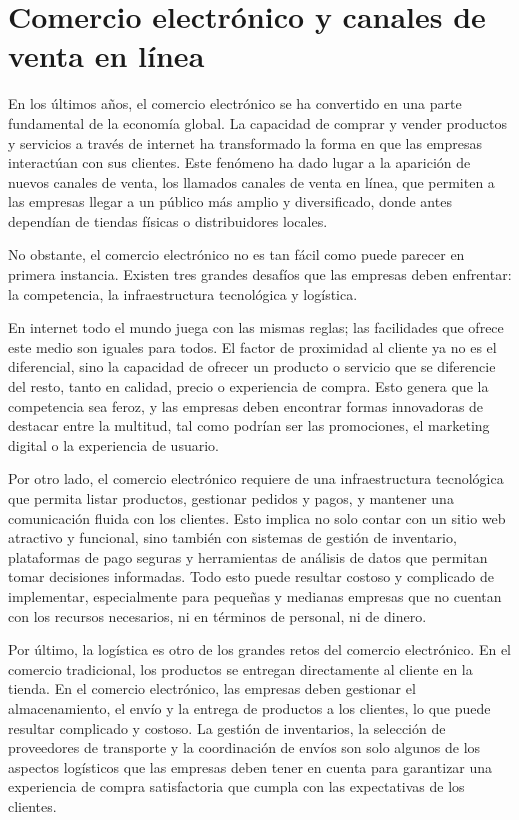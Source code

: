 \section{Comercio electrónico y canales de venta en línea}
\label{sec:comercio_canales}

En los últimos años, el comercio electrónico se ha convertido en una parte fundamental de la economía global. La capacidad de comprar y vender productos y servicios a través de internet ha transformado la forma en que las empresas interactúan con sus clientes. Este fenómeno ha dado lugar a la aparición de nuevos canales de venta, los llamados canales de venta en línea, que permiten a las empresas llegar a un público más amplio y diversificado, donde antes dependían de tiendas físicas o distribuidores locales.

No obstante, el comercio electrónico no es tan fácil como puede parecer en primera instancia. Existen tres grandes desafíos que las empresas deben enfrentar: la competencia, la infraestructura tecnológica y logística.

En internet todo el mundo juega con las mismas reglas; las facilidades que ofrece este medio son iguales para todos. El factor de proximidad al cliente ya no es el diferencial, sino la capacidad de ofrecer un producto o servicio que se diferencie del resto, tanto en calidad, precio o experiencia de compra. Esto genera que la competencia sea feroz, y las empresas deben encontrar formas innovadoras de destacar entre la multitud, tal como podrían ser las promociones, el marketing digital o la experiencia de usuario.

Por otro lado, el comercio electrónico requiere de una infraestructura tecnológica que permita listar productos, gestionar pedidos y pagos, y mantener una comunicación fluida con los clientes. Esto implica no solo contar con un sitio web atractivo y funcional, sino también con sistemas de gestión de inventario, plataformas de pago seguras y herramientas de análisis de datos que permitan tomar decisiones informadas. Todo esto puede resultar costoso y complicado de implementar, especialmente para pequeñas y medianas empresas que no cuentan con los recursos necesarios, ni en términos de personal, ni de dinero.

Por último, la logística es otro de los grandes retos del comercio electrónico. En el comercio tradicional, los productos se entregan directamente al cliente en la tienda. En el comercio electrónico, las empresas deben gestionar el almacenamiento, el envío y la entrega de productos a los clientes, lo que puede resultar complicado y costoso. La gestión de inventarios, la selección de proveedores de transporte y la coordinación de envíos son solo algunos de los aspectos logísticos que las empresas deben tener en cuenta para garantizar una experiencia de compra satisfactoria que cumpla con las expectativas de los clientes.

